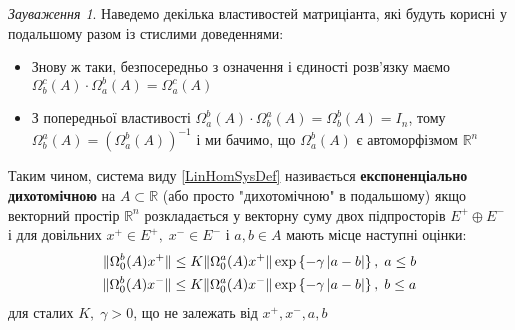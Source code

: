 \documentclass[14pt]{extarticle} %
\theoremstyle{remark}
\newtheorem{remark}{Зауваження}
\begin{document}
\begin{remark}
Наведемо декілька властивостей матриціанта, які будуть корисні у подальшому разом із стислими доведеннями:
\begin{itemize}
	\item{Знову ж таки, безпосередньо з означення і єдиності розв’язку маємо $\Omega_b^c(A)\cdot\Omega_a^b(A)=\Omega_a^c(A)$}
	\item{З попередньої властивості $\Omega_a^b(A)\cdot\Omega_b^a(A)=\Omega_b^b(A)=I_n$, тому $\Omega_b^a(A)=\left(\Omega_a^b(A)\right)^{-1}$
		і ми бачимо, що $\Omega_a^b(A)$ є автоморфізмом $\mathbb{R}^n$}
\end{itemize}
\end{remark}

Таким чином, система виду \ref{LinHomSysDef} називається \textbf{експоненціально дихотомічною} на $A\subset\mathbb{R}$
(або просто "дихотомічною" в подальшому) якщо векторний простір $\mathbb{R}^n$ розкладається
у векторну суму двох підпросторів $E^+\oplus E^-$ і для довільних $x^+\in E^+,\; x^-\in E^-$ і $a,b\in A$ мають місце наступні оцінки:
\begin{equation}\begin{aligned}\label{DichotomyDef}
	\|\Omega^b_0(A)x^+\|\leq K\|\Omega_0^a(A)x^+\|\exp\left\{-\gamma\left|a-b\right|\right\},\;a\leq b\\
	\|\Omega^b_0(A)x^-\|\leq K\|\Omega_0^a(A)x^-\|\exp\left\{-\gamma\left|a-b\right|\right\},\;b\leq a\\
\end{aligned}\end{equation}
для сталих $K,\;\gamma>0$, що не залежать від $x^+,x^-,a,b$
\end{document}
